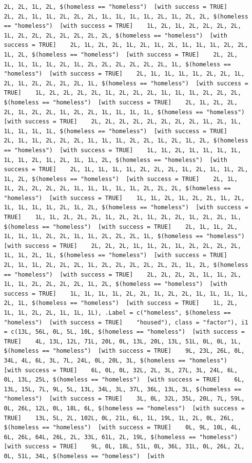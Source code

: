 \documentclass{tufte-book}\usepackage[]{graphicx}\usepackage[]{xcolor}
\makeatletter
\newenvironment{kframe}{%
 \def\at@end@of@kframe{}%
 \ifinner\ifhmode%
  \def\at@end@of@kframe{\end{minipage}}%
  \begin{minipage}{\columnwidth}%
 \fi\fi%
 \def\FrameCommand##1{\hskip\@totalleftmargin \hskip-\fboxsep
 \colorbox{shadecolor}{##1}\hskip-\fboxsep
     \hskip-\linewidth \hskip-\@totalleftmargin \hskip\columnwidth}%
 \MakeFramed {\advance\hsize-\width
   \@totalleftmargin\z@ \linewidth\hsize
   \@setminipage}}%
 {\par\unskip\endMakeFramed%
 \at@end@of@kframe}
\newenvironment{knitrout}{}{} %
\makeatother
\begin{document}
\begin{knitrout}
\begin{kframe}
\begin{verbatim}
2L, 2L, 1L, 2L, $(homeless == "homeless")  [with success = TRUE]    2L, 2L, 1L, 1L, 2L, 2L, 2L, 1L, 1L, 1L, 1L, 2L, 1L, 2L, 2L, $(homeless == "homeless")  [with success = TRUE]    1L, 2L, 1L, 2L, 2L, 2L, 2L, 1L, 2L, 2L, 2L, 2L, 2L, 2L, 2L, $(homeless == "homeless")  [with success = TRUE]    2L, 1L, 2L, 2L, 1L, 2L, 1L, 2L, 1L, 1L, 1L, 2L, 2L, 1L, 2L, $(homeless == "homeless")  [with success = TRUE]    2L, 2L, 1L, 1L, 1L, 1L, 2L, 1L, 2L, 2L, 2L, 2L, 2L, 2L, 1L, $(homeless == "homeless")  [with success = TRUE]    2L, 1L, 1L, 1L, 1L, 2L, 2L, 1L, 2L, 1L, 2L, 2L, 2L, 2L, 1L, $(homeless == "homeless")  [with success = TRUE]    1L, 2L, 2L, 2L, 2L, 1L, 2L, 2L, 2L, 1L, 1L, 1L, 2L, 2L, 2L, $(homeless == "homeless")  [with success = TRUE]    2L, 1L, 2L, 2L, 2L, 1L, 2L, 2L, 1L, 2L, 2L, 1L, 1L, 1L, 1L, $(homeless == "homeless")  [with success = TRUE]    2L, 2L, 2L, 2L, 2L, 2L, 2L, 2L, 1L, 2L, 1L, 1L, 1L, 1L, 1L, $(homeless == "homeless")  [with success = TRUE]    2L, 1L, 1L, 2L, 2L, 2L, 1L, 1L, 1L, 2L, 2L, 1L, 2L, 1L, 2L, $(homeless == "homeless")  [with success = TRUE]    1L, 1L, 2L, 1L, 1L, 1L, 1L, 1L, 1L, 2L, 1L, 2L, 1L, 1L, 2L, $(homeless == "homeless")  [with success = TRUE]    2L, 1L, 1L, 1L, 1L, 2L, 2L, 2L, 1L, 2L, 1L, 1L, 2L, 1L, 2L, $(homeless == "homeless")  [with success = TRUE]    2L, 1L, 1L, 2L, 2L, 2L, 2L, 1L, 1L, 1L, 1L, 1L, 2L, 2L, 2L, $(homeless == "homeless")  [with success = TRUE]    1L, 1L, 2L, 1L, 2L, 2L, 1L, 2L, 1L, 1L, 1L, 1L, 2L, 1L, 2L, $(homeless == "homeless")  [with success = TRUE]    1L, 1L, 2L, 2L, 2L, 1L, 2L, 2L, 1L, 2L, 2L, 1L, 2L, 2L, 1L, $(homeless == "homeless")  [with success = TRUE]    2L, 1L, 1L, 2L, 1L, 1L, 1L, 2L, 2L, 1L, 1L, 2L, 2L, 2L, 1L, $(homeless == "homeless")  [with success = TRUE]    2L, 2L, 2L, 1L, 1L, 2L, 1L, 2L, 2L, 2L, 2L, 1L, 1L, 2L, 1L, $(homeless == "homeless")  [with success = TRUE]    2L, 1L, 1L, 2L, 2L, 2L, 1L, 2L, 2L, 2L, 2L, 2L, 2L, 1L, 2L, $(homeless == "homeless")  [with success = TRUE]    2L, 2L, 2L, 2L, 1L, 1L, 2L, 1L, 1L, 2L, 2L, 2L, 2L, 1L, 2L, $(homeless == "homeless")  [with success = TRUE]    1L, 1L, 1L, 1L, 2L, 2L, 1L, 2L, 2L, 1L, 1L, 1L, 1L, 2L, 1L, $(homeless == "homeless")  [with success = TRUE]    1L, 2L, 1L, 1L, 2L, 2L, 1L, 1L, 1L), .Label = c("homeless", $(homeless == "homeless")  [with success = TRUE]    "housed"), class = "factor"), i1 = c(13L, 56L, 0L, 5L, 10L, $(homeless == "homeless")  [with success = TRUE]    4L, 13L, 12L, 71L, 20L, 0L, 13L, 20L, 13L, 51L, 0L, 0L, 1L, $(homeless == "homeless")  [with success = TRUE]    9L, 23L, 26L, 0L, 34L, 4L, 6L, 3L, 7L, 24L, 0L, 20L, 3L, $(homeless == "homeless")  [with success = TRUE]    6L, 0L, 0L, 32L, 2L, 3L, 27L, 3L, 24L, 6L, 0L, 13L, 25L, $(homeless == "homeless")  [with success = TRUE]    6L, 13L, 15L, 7L, 9L, 5L, 13L, 34L, 3L, 37L, 36L, 13L, 3L, $(homeless == "homeless")  [with success = TRUE]    3L, 0L, 32L, 35L, 20L, 7L, 59L, 0L, 26L, 12L, 0L, 18L, 6L, $(homeless == "homeless")  [with success = TRUE]    13L, 5L, 2L, 102L, 0L, 21L, 6L, 1L, 19L, 1L, 2L, 0L, 26L, $(homeless == "homeless")  [with success = TRUE]    0L, 9L, 10L, 4L, 6L, 26L, 64L, 26L, 2L, 33L, 61L, 2L, 19L, $(homeless == "homeless")  [with success = TRUE]    9L, 0L, 18L, 51L, 0L, 36L, 31L, 0L, 26L, 2L, 0L, 51L, 34L, $(homeless == "homeless")  [with 
\end{verbatim}
\end{kframe}
\end{knitrout}
\end{document}
